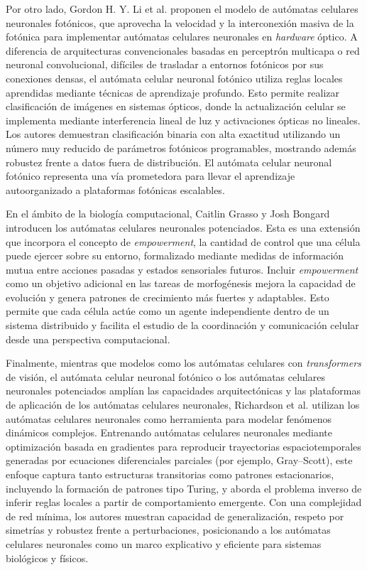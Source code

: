 Por otro lado, Gordon H. Y. Li et al. \cite{li2024_pnca} proponen el modelo de autómatas celulares neuronales fotónicos, que aprovecha la velocidad y la interconexión masiva de la fotónica para implementar autómatas celulares neuronales en \textit{hardware} óptico. A diferencia de arquitecturas convencionales basadas en perceptrón multicapa o red neuronal convolucional, difíciles de trasladar a entornos fotónicos por sus conexiones densas, el autómata celular neuronal fotónico utiliza reglas locales aprendidas mediante técnicas de aprendizaje profundo. Esto permite realizar clasificación de imágenes en sistemas ópticos, donde la actualización celular se implementa mediante interferencia lineal de luz y activaciones ópticas no lineales. Los autores demuestran clasificación binaria con alta exactitud utilizando un número muy reducido de parámetros fotónicos programables, mostrando además robustez frente a datos fuera de distribución. El autómata celular neuronal fotónico representa una vía prometedora para llevar el aprendizaje autoorganizado a plataformas fotónicas escalables.

En el ámbito de la biología computacional, Caitlin Grasso y Josh Bongard \cite{grasso2022_enca} introducen los autómatas celulares neuronales potenciados. Esta es una extensión que incorpora el concepto de \textit{empowerment}, la cantidad de control que una célula puede ejercer sobre su entorno, formalizado mediante medidas de información mutua entre acciones pasadas y estados sensoriales futuros. Incluir \textit{empowerment} como un objetivo adicional en las tareas de morfogénesis mejora la capacidad de evolución y genera patrones de crecimiento más fuertes y adaptables. Esto permite que cada célula actúe como un agente independiente dentro de un sistema distribuido y facilita el estudio de la coordinación y comunicación celular desde una perspectiva computacional.

Finalmente, mientras que modelos como los autómatas celulares con \textit{transformers} de visión, el autómata celular neuronal fotónico o los autómatas celulares neuronales potenciados amplían las capacidades arquitectónicas y las plataformas de aplicación de los autómatas celulares neuronales, Richardson et al. \cite{richardson2024_nca} utilizan los autómatas celulares neuronales como herramienta para modelar fenómenos dinámicos complejos. Entrenando autómatas celulares neuronales mediante optimización basada en gradientes para reproducir trayectorias espaciotemporales generadas por ecuaciones diferenciales parciales (por ejemplo, Gray–Scott), este enfoque captura tanto estructuras transitorias como patrones estacionarios, incluyendo la formación de patrones tipo Turing, y aborda el problema inverso de inferir reglas locales a partir de comportamiento emergente. Con una complejidad de red mínima, los autores muestran capacidad de generalización, respeto por simetrías y robustez frente a perturbaciones, posicionando a los autómatas celulares neuronales como un marco explicativo y eficiente para sistemas biológicos y físicos.


